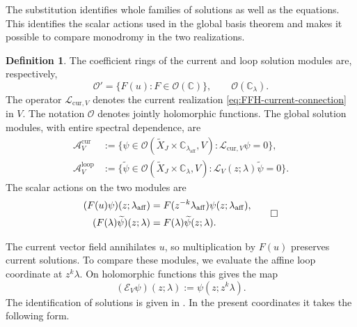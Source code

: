 \documentclass[11pt,leqno]{amsart}
\numberwithin{equation}{section}
\theoremstyle{plain}
\theoremstyle{definition}
\newtheorem{definition}[theorem]{Definition}
\theoremstyle{plain}
\theoremstyle{definition}
\theoremstyle{remark}
\begin{document}
The substitution identifies whole families of solutions as well as the equations.  This identifies the scalar actions used in the global basis theorem and makes it possible to compare monodromy in the two realizations.
\begin{definition}\label{def:FFH-solution-modules}
The coefficient rings of the current and loop solution modules are, respectively,
\begin{equation}\label{eq:Oprime}
 \mathcal O'
 =\{F(u):F\in\mathcal O(\mathbb C)\},\qquad
 \mathcal O(\mathbb C_\lambda).
\end{equation}
The operator $\mathcal L_{\mathrm{cur},V}$ denotes the current realization \eqref{eq:FFH-current-connection} in $V$.  The notation $\mathcal O$ denotes jointly holomorphic functions.  The global solution modules, with entire spectral dependence, are
\[
 \begin{aligned}
 \mathcal A_V^{\mathrm{cur}}
 &:=\{\psi\in\mathcal O(\widetilde X_J\times\mathbb C_{\lambda_{\mathrm{aff}}},V):
                 \mathcal L_{\mathrm{cur},V}\psi=0\},\\
 \mathcal A_V^{\mathrm{loop}}
 &:=\{\widetilde\psi\in\mathcal O(\widetilde X_J\times\mathbb C_\lambda,V):
                 \mathcal L_V(z;\lambda)\widetilde\psi=0\}.
 \end{aligned}
\]
The scalar actions on the two modules are
\[
 \begin{aligned}
 (F(u)\psi)(z;\lambda_{\mathrm{aff}})
   &=F(z^{-k}\lambda_{\mathrm{aff}})\psi(z;\lambda_{\mathrm{aff}}),\\
 (F(\lambda)\widetilde\psi)(z;\lambda)
   &=F(\lambda)\widetilde\psi(z;\lambda).
 \end{aligned}
\qedhere
\]
\end{definition}
The current vector field annihilates $u$, so multiplication by $F(u)$ preserves current solutions.  To compare these modules, we evaluate the affine loop coordinate at $z^k\lambda$.  On holomorphic functions this gives the map
\begin{equation}\label{eq:loop-current-evaluation}
 (\mathscr E_V\psi)(z;\lambda)
 :=\psi(z;z^k\lambda).
\end{equation}
The identification of solutions is given in \cite[Lemma~3.4]{MR2024}.  In the present coordinates it takes the following form.
\end{document}
